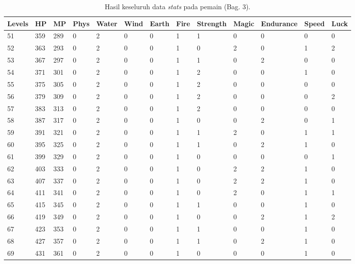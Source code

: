 \begin{sidewaystable}[!h]
	\centering
	\caption{Hasil keseluruh data \textit{stats} pada pemain (Bag. 3).}
	\label{tb:player_all_stats_3}
	\vspace{1ex}
		\begin{tabular}{|l|l|l|l|l|l|l|l|l|l|l|l|l|}
			\hline
			\rowcolor[HTML]{C0C0C0} 
			\textbf{Levels} & \textbf{HP} & \textbf{MP} & \textbf{Phys} & \textbf{Water} & \textbf{Wind} & \textbf{Earth} & \textbf{Fire} & \textbf{Strength} & \textbf{Magic} & \textbf{Endurance} & \textbf{Speed} & \textbf{Luck} \\ \hline
			51 & 359 & 289 & 0 & 2 & 0 & 0 & 1 & 1 & 0 & 0 & 0 & 0 \\ \hline
			52 & 363 & 293 & 0 & 2 & 0 & 0 & 1 & 0 & 2 & 0 & 1 & 2 \\ \hline
			53 & 367 & 297 & 0 & 2 & 0 & 0 & 1 & 1 & 0 & 2 & 0 & 0 \\ \hline
			54 & 371 & 301 & 0 & 2 & 0 & 0 & 1 & 2 & 0 & 0 & 1 & 0 \\ \hline
			55 & 375 & 305 & 0 & 2 & 0 & 0 & 1 & 2 & 0 & 0 & 0 & 0 \\ \hline
			56 & 379 & 309 & 0 & 2 & 0 & 0 & 1 & 2 & 0 & 0 & 0 & 2 \\ \hline
			57 & 383 & 313 & 0 & 2 & 0 & 0 & 1 & 2 & 0 & 0 & 0 & 0 \\ \hline
			58 & 387 & 317 & 0 & 2 & 0 & 0 & 1 & 0 & 0 & 2 & 0 & 1 \\ \hline
			59 & 391 & 321 & 0 & 2 & 0 & 0 & 1 & 1 & 2 & 0 & 1 & 1 \\ \hline
			60 & 395 & 325 & 0 & 2 & 0 & 0 & 1 & 1 & 0 & 2 & 1 & 0 \\ \hline
			61 & 399 & 329 & 0 & 2 & 0 & 0 & 1 & 0 & 0 & 0 & 0 & 1 \\ \hline
			62 & 403 & 333 & 0 & 2 & 0 & 0 & 1 & 0 & 2 & 2 & 1 & 0 \\ \hline
			63 & 407 & 337 & 0 & 2 & 0 & 0 & 1 & 0 & 2 & 2 & 1 & 0 \\ \hline
			64 & 411 & 341 & 0 & 2 & 0 & 0 & 1 & 0 & 2 & 0 & 1 & 1 \\ \hline
			65 & 415 & 345 & 0 & 2 & 0 & 0 & 1 & 1 & 0 & 0 & 1 & 0 \\ \hline
			66 & 419 & 349 & 0 & 2 & 0 & 0 & 1 & 0 & 0 & 2 & 1 & 2 \\ \hline
			67 & 423 & 353 & 0 & 2 & 0 & 0 & 1 & 1 & 0 & 0 & 1 & 0 \\ \hline
			68 & 427 & 357 & 0 & 2 & 0 & 0 & 1 & 1 & 0 & 2 & 1 & 0 \\ \hline
			69 & 431 & 361 & 0 & 2 & 0 & 0 & 1 & 0 & 0 & 0 & 1 & 0 \\ \hline

\end{tabular}
\end{sidewaystable}
